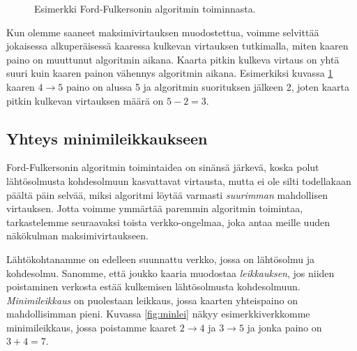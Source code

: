 \begin{figure}
\begin{center}
\end{center}
\caption{Esimerkki Ford-Fulkersonin algoritmin toiminnasta.}
\label{fig:floesi}
\end{figure}

Kun olemme saaneet maksimivirtauksen muodostettua,
voimme selvittää jokaisessa alkuperäisessä kaaressa kulkevan
virtauksen tutkimalla, miten kaaren paino on muuttunut algoritmin aikana.
Kaarta pitkin kulkeva virtaus on yhtä suuri kuin kaaren painon
vähennys algoritmin aikana.
Esimerkiksi kuvassa \ref{fig:floesi} kaaren $4 \rightarrow 5$
paino on alussa 5 ja algoritmin suorituksen jälkeen 2,
joten kaarta pitkin kulkevan virtauksen määrä on $5-2=3$.

\subsection{Yhteys minimileikkaukseen}

Ford-Fulkersonin algoritmin toimintaidea on sinänsä järkevä,
koska polut lähtösolmusta kohdesolmuun kasvattavat virtausta,
mutta ei ole silti todellakaan päältä päin selvää,
miksi algoritmi löytää varmasti \emph{suurimman} mahdollisen virtauksen.
Jotta voimme ymmärtää paremmin algoritmin toimintaa,
tarkastelemme seuraavaksi toista verkko-ongelmaa,
joka antaa meille uuden näkökulman maksimivirtaukseen.

Lähtökohtanamme on edelleen suunnattu verkko,
jossa on lähtösolmu ja kohdesolmu.
Sanomme, että joukko kaaria muodostaa \emph{leikkauksen},
jos niiden poistaminen verkosta estää kulkemisen
lähtösolmusta kohdesolmuun.
\emph{Minimileikkaus} on puolestaan leikkaus,
jossa kaarten yhteispaino on mahdollisimman pieni.
Kuvassa \ref{fig:minlei} näkyy esimerkkiverkkomme minimileikkaus,
jossa poistamme kaaret $2 \rightarrow 4$ ja $3 \rightarrow 5$
ja jonka paino on $3+4=7$.

